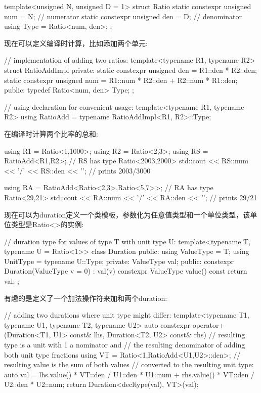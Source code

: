 \begin{cpp}
template<unsigned N, unsigned D = 1>
struct Ratio {
	static constexpr unsigned num = N; // numerator
	static constexpr unsigned den = D; // denominator
	using Type = Ratio<num, den>;
};
\end{cpp}

现在可以定义编译时计算，比如添加两个单元:

\begin{cpp}
// implementation of adding two ratios:
template<typename R1, typename R2>
struct RatioAddImpl
{
	private:
	static constexpr unsigned den = R1::den * R2::den;
	static constexpr unsigned num = R1::num * R2::den + R2::num * R1::den;
	public:
	typedef Ratio<num, den> Type;
};

// using declaration for convenient usage:
template<typename R1, typename R2>
using RatioAdd = typename RatioAddImpl<R1, R2>::Type;
\end{cpp}

在编译时计算两个比率的总和:

\begin{cpp}
using R1 = Ratio<1,1000>;
using R2 = Ratio<2,3>;
using RS = RatioAdd<R1,R2>; // RS has type Ratio<2003,2000>
std::cout << RS::num << ’/’ << RS::den << ’\n’; // prints 2003/3000

using RA = RatioAdd<Ratio<2,3>,Ratio<5,7>>; // RA has type Ratio<29,21>
std::cout << RA::num << ’/’ << RA::den << ’\n’; // prints 29/21
\end{cpp}

现在可以为duration定义一个类模板，参数化为任意值类型和一个单位类型，该单位类型是Ratio<>的实例:

\begin{cpp}
// duration type for values of type T with unit type U:
template<typename T, typename U = Ratio<1>>
class Duration {
	public:
	using ValueType = T;
	using UnitType = typename U::Type;
	private:
	ValueType val;
	public:
	constexpr Duration(ValueType v = 0)
	: val(v) {
	}
	constexpr ValueType value() const {
		return val;
	}
};
\end{cpp}

有趣的是定义了一个加法操作符来加和两个duration:

\begin{cpp}
// adding two durations where unit type might differ:
template<typename T1, typename U1, typename T2, typename U2>
auto constexpr operator+(Duration<T1, U1> const& lhs,
						 Duration<T2, U2> const& rhs)
{
	// resulting type is a unit with 1 a nominator and
	// the resulting denominator of adding both unit type fractions
	using VT = Ratio<1,RatioAdd<U1,U2>::den>;
	// resulting value is the sum of both values
	// converted to the resulting unit type:
	auto val = lhs.value() * VT::den / U1::den * U1::num +
				rhs.value() * VT::den / U2::den * U2::num;
	return Duration<decltype(val), VT>(val);
}
\end{cpp}

